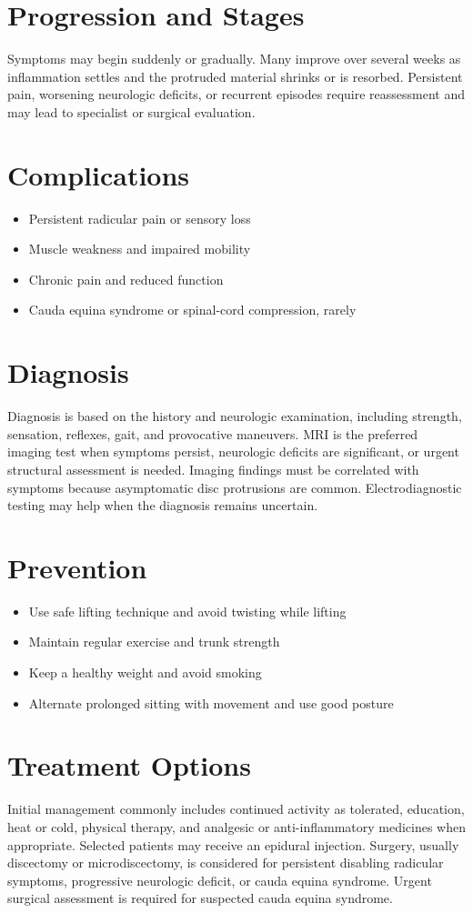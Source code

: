 \section{Progression and Stages}
Symptoms may begin suddenly or gradually. Many improve over several weeks as inflammation settles and the protruded material shrinks or is resorbed. Persistent pain, worsening neurologic deficits, or recurrent episodes require reassessment and may lead to specialist or surgical evaluation.
\section{Complications}
\begin{itemize}[noitemsep]
  \item Persistent radicular pain or sensory loss
  \item Muscle weakness and impaired mobility
  \item Chronic pain and reduced function
  \item Cauda equina syndrome or spinal-cord compression, rarely
\end{itemize}
\section{Diagnosis}
Diagnosis is based on the history and neurologic examination, including strength, sensation, reflexes, gait, and provocative maneuvers. MRI is the preferred imaging test when symptoms persist, neurologic deficits are significant, or urgent structural assessment is needed. Imaging findings must be correlated with symptoms because asymptomatic disc protrusions are common. Electrodiagnostic testing may help when the diagnosis remains uncertain.
\section{Prevention}
\begin{itemize}[noitemsep]
  \item Use safe lifting technique and avoid twisting while lifting
  \item Maintain regular exercise and trunk strength
  \item Keep a healthy weight and avoid smoking
  \item Alternate prolonged sitting with movement and use good posture
\end{itemize}
\section{Treatment Options}
Initial management commonly includes continued activity as tolerated, education, heat or cold, physical therapy, and analgesic or anti-inflammatory medicines when appropriate. Selected patients may receive an epidural injection. Surgery, usually discectomy or microdiscectomy, is considered for persistent disabling radicular symptoms, progressive neurologic deficit, or cauda equina syndrome. Urgent surgical assessment is required for suspected cauda equina syndrome.
